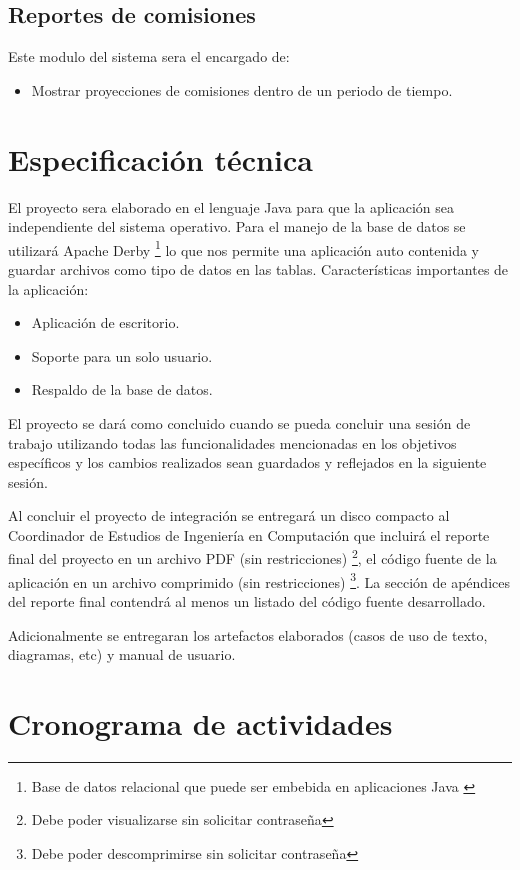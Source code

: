 \subsection*{Reportes de comisiones}

Este modulo del sistema sera el encargado de:
\begin{itemize}
	\item Mostrar proyecciones de comisiones dentro de un periodo de tiempo.
\end{itemize}

\section{Especificación técnica}
El proyecto sera elaborado en el lenguaje Java para que la aplicación sea independiente del sistema operativo. Para el manejo de la base de datos se utilizará Apache Derby \footnote{Base de datos relacional que puede ser embebida en aplicaciones Java \cite{www:derby}} lo que nos permite una aplicación auto contenida y guardar archivos como tipo de datos en las tablas.
Características importantes de la aplicación:
\begin{itemize}
	\item Aplicación de escritorio.
	\item Soporte para un solo usuario.
	\item Respaldo de la base de datos.
\end{itemize}

El proyecto se dará como concluido cuando se pueda concluir una sesión de trabajo utilizando todas las funcionalidades mencionadas en los objetivos específicos y los cambios realizados sean guardados y reflejados en la siguiente sesión.

Al concluir el proyecto de integración se entregará un disco compacto al Coordinador
de Estudios de Ingeniería en Computación que incluirá el reporte final del proyecto
en un archivo PDF (sin restricciones) \footnote{Debe poder visualizarse sin solicitar contraseña}, el código fuente de la aplicación en un archivo comprimido (sin restricciones) \footnote{Debe poder descomprimirse sin solicitar contraseña}. La sección de apéndices del reporte final contendrá al menos un listado del código fuente desarrollado.

Adicionalmente se entregaran los artefactos elaborados (casos de uso de texto, diagramas, etc) y manual de usuario.

\section{Cronograma de actividades}

